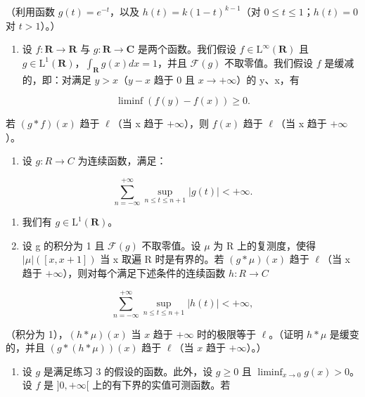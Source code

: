 （利用函数 \(g(t) = e^{-t}\)，以及 \(h(t) = k(1 - t)^{k-1}\)（对 \(0 \leqslant t \leqslant 1\)；\(h(t) = 0\) 对 \(t > 1\)）。）

\begin{enumerate}
\def\labelenumi{\arabic{enumi})}
\setcounter{enumi}{5}
\tightlist
\item
  设 \(f \colon \mathbf{R} \to \mathbf{R}\) 与 \(g: \mathbf{R} \to \mathbf{C}\) 是两个函数。我们假设 \(f \in \mathrm{L}^{\infty}(\mathbf{R})\) 且 \(g \in \mathrm{L}^{1}(\mathbf{R})\)，\(\int_{\mathbf{R}} g(x) dx = 1\)，并且 \(\mathcal{F}(g)\) 不取零值。我们假设 \(f\) 是缓减的，即：对满足 \(y > x\)（\(y - x\) 趋于 0 且 \(x \to +\infty\)）的 y、x，有
\end{enumerate}

\[
\liminf (f (y) - f (x)) \geqslant 0.
\]

若 \((g*f)(x)\) 趋于 \(\ell\)（当 x 趋于 \(+\infty\)），则 \(f(x)\) 趋于 \(\ell\)（当 x 趋于 \(+\infty\)）。

\begin{enumerate}
\def\labelenumi{\arabic{enumi})}
\setcounter{enumi}{6}
\tightlist
\item
  设 \(g: R \rightarrow C\) 为连续函数，满足：
\end{enumerate}

\[
\sum_ {n = - \infty} ^ {+ \infty} \sup _ {n \leqslant t \leqslant n + 1} | g (t) | <   + \infty .
\]

\begin{enumerate}
\def\labelenumi{\alph{enumi})}
\item
  我们有 \(g \in \mathrm{L}^{1}(\mathbf{R})\)。
\item
  设 g 的积分为 1 且 \(\mathcal{F}(g)\) 不取零值。设 \(\mu\) 为 R 上的复测度，使得 \(|\mu|([x,x+1])\) 当 x 取遍 R 时是有界的。若 \((g*\mu)(x)\) 趋于 \(\ell\)（当 x 趋于 \(+\infty\)），则对每个满足下述条件的连续函数 \(h:R\to C\)
\end{enumerate}

\[
\sum_ {n = - \infty} ^ {+ \infty} \sup _ {n \leqslant t \leqslant n + 1} | h (t) | <   + \infty ,
\]

（积分为 1），\((h * \mu)(x)\) 当 \(x\) 趋于 \(+\infty\) 时的极限等于 \(\ell\)。（证明 \(h * \mu\) 是缓变的，并且 \((g * (h * \mu))(x)\) 趋于 \(\ell\)（当 \(x\) 趋于 \(+\infty\)）。）

\begin{enumerate}
\def\labelenumi{\arabic{enumi})}
\setcounter{enumi}{7}
\tightlist
\item
  设 \(g\) 是满足练习 3 的假设的函数。此外，设 \(g \geqslant 0\) 且 \(\liminf_{x \to 0} g(x) > 0\)。设 \(f\) 是 \(]0, +\infty[\) 上的有下界的实值可测函数。若
\end{enumerate}

